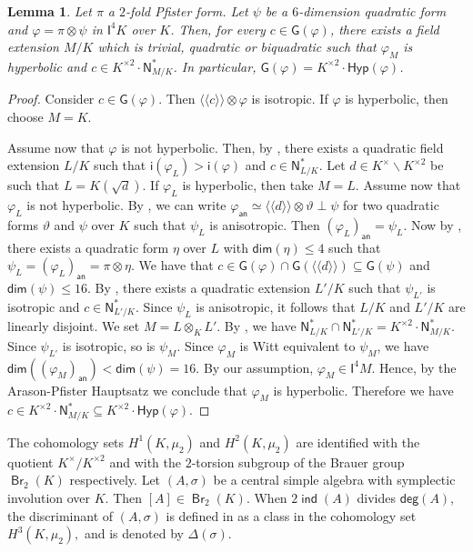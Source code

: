 \documentclass[twoside,11pt]{amsart}
\numberwithin{equation}{section}
\newtheorem{lem}[equation]{Lemma}
\theoremstyle{definition}
\renewcommand{\dim}{\operatorname{\mathsf{dim}}}
\renewcommand{\deg}{\operatorname{\mathsf{deg}}}
\newcommand\ind{\operatorname{\mathsf{ind}}}
\newcommand\Br{\operatorname{\mathsf{Br}}}
\newcommand\N{\operatorname{N}}
\newcommand{\vf}{\varphi}
\newcommand{\mg}[1]{{#1}^{\times}}
\newcommand{\sq}[1]{{#1}^{\times 2}}
\newcommand{\s}{\sigma}
\newcommand{\la}{\langle}
\newcommand{\ra}{\rangle}
\newcommand{\lla}{\la\!\la}
\newcommand{\rra}{\ra\!\ra}
\newcommand{\an}{\mathsf{an}}
\renewcommand{\leq}{\leqslant}
\newcommand{\I}{\mathsf{I}}
\renewcommand{\N}{\mathsf{N}}
\newcommand{\G}{\mathsf{G}}
\newcommand{\Hyp}{\mathsf{Hyp}}
\renewcommand{\setminus}{\smallsetminus}
\renewcommand{\deg}{\mathsf{deg}}
\renewcommand{\dim}{\mathsf{dim}}
\renewcommand{\leq}{\leqslant}
\newcommand{\wi}{\mathsf{i}}
\renewcommand{\setminus}{\smallsetminus}
\begin{document}
    \begin{lem}\label{24}
      Let $\pi$ a $2$-fold Pfister form. Let $\psi$ be a $6$-dimension quadratic form and $\vf=\pi\otimes \psi$ in $\I^4K$ over $K$. 
      Then, for every $c\in \G(\vf)$, there exists a field extension $M/K$ which is trivial, quadratic or biquadratic such that $\vf_{M}$ is hyperbolic and $c\in\sq{K}\cdot \N_{M/K}^\ast$. In particular, $\G(\vf)=\sq{K}\cdot\Hyp(\vf)$.
    \end{lem}
    \begin{proof}
    Consider $c\in \G(\vf)$. 
    Then $\lla c \rra \otimes \vf $ is isotropic. 
    If $\vf$ is hyperbolic, then choose $M=K$.
    
    Assume now that $\vf$ is not hyperbolic.
Then, by , there exists a quadratic field extension $L/K$ such that  $\wi(\vf_L)>\wi(\vf)$ and $c\in\N_{L/K}^\ast$.
    Let $d\in\mg{K}\setminus\sq{K}$ be such that $L=K(\sqrt{d})$.
    If $\vf_L$ is hyperbolic, then take $M=L$. Assume now that $\vf_L$ is not hyperbolic.
    By \cite[Cor.~22.12]{EKM08}, we can write $\vf_\an\simeq \lla d\rra\otimes \vartheta\perp\psi$ for two quadratic forms $\vartheta$ and $\psi$ over $K$ such that $\psi_L$ is anisotropic. Then $(\vf_L)_\an=\psi_L$. Now by , there exists a quadratic form $\eta$ over $L$  with $\dim(\eta)\leq 4$ such that $\psi_L=(\vf_L)_{\an}=\pi\otimes \eta$.
    We have that $c\in\G(\vf)\cap\G(\lla d\rra)\subseteq\G(\psi)$ and $\dim(\psi)\leq 16$. By , there exists a quadratic extension $L'/K$ such that $\psi_{L'}$ is isotropic and $c\in\N_{L'/K}^\ast$. Since $\psi_{L}$ is anisotropic, it follows that $L/K$ and $L'/K$ are linearly disjoint.
    We set $M=L\otimes_KL'$.
    By \cite[Lemma~3.3]{AB25}, we have  $\N_{L/K}^\ast\cap\N_{L'/K}^\ast=\sq{K}\cdot\N_{M/K}^\ast$.
    Since $\psi_{L'}$ is isotropic, so is $\psi_M$. 
    Since $\vf_M$ is Witt equivalent to $\psi_M$, we have $\dim((\vf_M)_\an)<\dim(\psi)=16$.
    By our assumption, $\vf_M\in \I^4M$. Hence, by the Arason-Pfister Hauptsatz \cite[Theorem 23.7]{EKM08} we conclude that $\vf_M$ is hyperbolic. Therefore we have  $c\in\sq{K}\cdot\N_{M/K}^\ast\subseteq \sq{K}\cdot\Hyp(\vf)$.
\end{proof}
The cohomology sets $H^1(K, \mu_2)$ and $H^2(K, \mu_2)$ are identified with the quotient $\mg{K}/\sq{K}$ and with the $2$-torsion subgroup of the
Brauer group $\Br_2(K)$ respectively. Let $(A,\s)$ be a central simple algebra with symplectic involution over $K$. Then $[A]\in \Br_2(K)$. When $2\ind(A)$ divides $\deg(A)$, the discriminant of $(A,\s)$ is defined in \cite{BMT03} as a class in the cohomology set $H^3(K,\mu_2),$ and is denoted by $\Delta(\s)$. 
\end{document}
